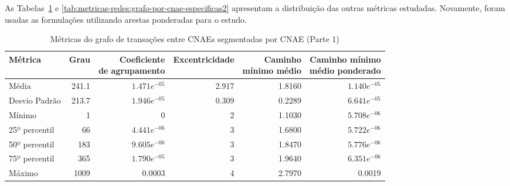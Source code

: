 As Tabelas~\ref{tab:metricas-redes:grafo-por-cnae-especificas1} e \ref{tab:metricas-redes:grafo-por-cnae-especificas2} apresentam a distribuição das outras métricas estudadas. Novamente, foram usadas as formulações utilizando arestas ponderadas para o estudo.

\begin{table}[htb]
\centering
\caption{Métricas do grafo de transações entre CNAEs segmentadas por CNAE (Parte 1)}
\label{tab:metricas-redes:grafo-por-cnae-especificas1}
\begin{tabular}{l|rrrrr}
\toprule
Métrica & Grau & \shortstack{Coeficiente\\de agrupamento} & Excentricidade & \shortstack{Caminho\\mínimo médio} & \shortstack{Caminho mínimo\\médio ponderado} \\
\midrule
Média         &  241.1 &   $1.471e^{-05}$ & 2.917 & 1.8160 & $1.140e^{-05}$ \\
Desvio Padrão &  213.7 &   $1.946e^{-05}$ & 0.309 & 0.2289 & $6.641e^{-05}$ \\
Mínimo        &    1   &                0 &     2 & 1.1030 & $5.708e^{-06}$ \\
25º percentil &   66   &   $4.441e^{-06}$ &     3 & 1.6800 & $5.722e^{-06}$ \\
50º percentil &  183   &   $9.605e^{-06}$ &     3 & 1.8470 & $5.776e^{-06}$ \\
75º percentil &  365   &   $1.790e^{-05}$ &     3 & 1.9640 & $6.351e^{-06}$ \\
Máximo        & 1009   &           0.0003 &     4 & 2.7970 &         0.0019 \\
\bottomrule
\end{tabular}
\fdadospesquisa
\end{table}

